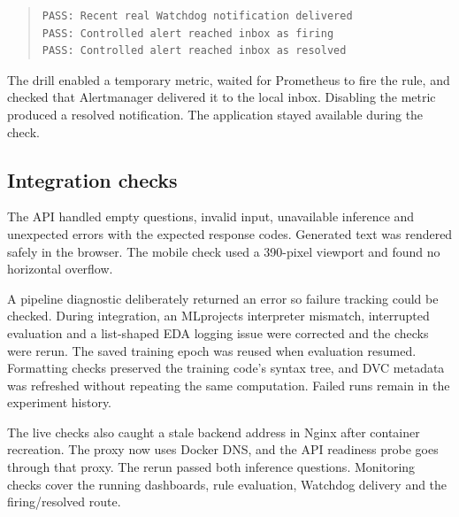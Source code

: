 \documentclass[11pt,a4paper]{article}
\begin{document}
\begin{quote}\small
\begin{verbatim}
PASS: Recent real Watchdog notification delivered
PASS: Controlled alert reached inbox as firing
PASS: Controlled alert reached inbox as resolved
\end{verbatim}
\end{quote}
The drill enabled a temporary metric, waited for Prometheus to fire the rule, and checked that Alertmanager delivered it to the local inbox. Disabling the metric produced a resolved notification. The application stayed available during the check.

\subsection*{Integration checks}
The API handled empty questions, invalid input, unavailable inference and unexpected errors with the expected response codes. Generated text was rendered safely in the browser. The mobile check used a 390-pixel viewport and found no horizontal overflow.

A pipeline diagnostic deliberately returned an error so failure tracking could be checked. During integration, an MLprojects interpreter mismatch, interrupted evaluation and a list-shaped EDA logging issue were corrected and the checks were rerun. The saved training epoch was reused when evaluation resumed. Formatting checks preserved the training code's syntax tree, and DVC metadata was refreshed without repeating the same computation. Failed runs remain in the experiment history.

The live checks also caught a stale backend address in Nginx after container recreation. The proxy now uses Docker DNS, and the API readiness probe goes through that proxy. The rerun passed both inference questions. Monitoring checks cover the running dashboards, rule evaluation, Watchdog delivery and the firing/resolved route.
\end{document}
